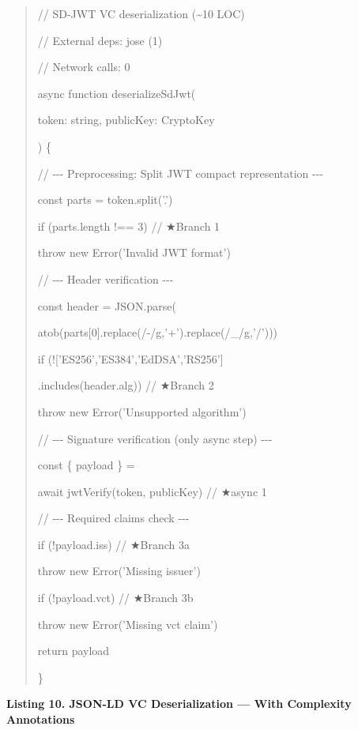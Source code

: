 \begin{quote}
// SD-JWT VC deserialization (\textasciitilde10 LOC)

// External deps: jose (1)

// Network calls: 0

async function deserializeSdJwt(

token: string, publicKey: CryptoKey

) \{

// -\/-\/- Preprocessing: Split JWT compact representation -\/-\/-

const parts = token.split('.')

if (parts.length !== 3) // ★Branch 1

throw new Error('Invalid JWT format')

// -\/-\/- Header verification -\/-\/-

const header = JSON.parse(

atob(parts{[}0{]}.replace(/-/g,'+').replace(/\_/g,'/')))

if (!{[}'ES256','ES384','EdDSA','RS256'{]}

.includes(header.alg)) // ★Branch 2

throw new Error('Unsupported algorithm')

// -\/-\/- Signature verification (only async step) -\/-\/-

const \{ payload \} =

await jwtVerify(token, publicKey) // ★async 1

// -\/-\/- Required claims check -\/-\/-

if (!payload.iss) // ★Branch 3a

throw new Error('Missing issuer')

if (!payload.vct) // ★Branch 3b

throw new Error('Missing vct claim')

return payload

\}
\end{quote}

\textbf{Listing 10. JSON-LD VC Deserialization --- With Complexity Annotations}

